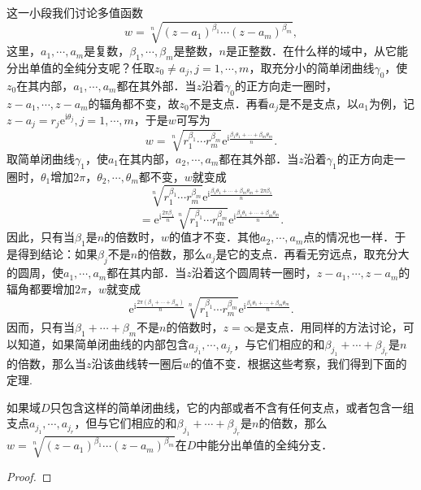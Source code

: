 \documentclass[../../main.tex]{subfiles}
\begin{document}
这一小段我们讨论多值函数
\[
w = \sqrt[n]{(z - a_1)^{\beta_1} \cdots (z - a_m)^{\beta_m}},
\]
这里，$a_1, \cdots, a_m$是复数，$\beta_1, \cdots, \beta_m$是整数，$n$是正整数．在什么样的域中，从它能分出单值的全纯分支呢？任取$z_0 \neq a_j, j = 1, \cdots, m$，取充分小的简单闭曲线$\gamma_0$，使$z_0$在其内部，$a_1, \cdots, a_m$都在其外部．当$z$沿着$\gamma_0$的正方向走一圈时，$z - a_1, \cdots, z - a_m$的辐角都不变，故$z_0$不是支点．再看$a_j$是不是支点，以$a_1$为例，记$z - a_j = r_j \text{e}^{\text{i}\theta_j}, j = 1, \cdots, m$，于是$w$可写为
\[
w = \sqrt[n]{r_1^{\beta_1} \cdots r_m^{\beta_m}} \text{e}^{\text{i}\frac{\beta_1 \theta_1 + \cdots + \beta_m \theta_m}{n}}.
\]
取简单闭曲线$\gamma_1$，使$a_1$在其内部，$a_2, \cdots, a_m$都在其外部．当$z$沿着$\gamma_1$的正方向走一圈时，$\theta_1$增加$2\pi$，$\theta_2, \cdots, \theta_m$都不变，$w$就变成
\[
\sqrt[n]{r_1^{\beta_1} \cdots r_m^{\beta_m}} \text{e}^{\text{i}\frac{\beta_1 \theta_1 + \cdots + \beta_m \theta_m + 2\pi \beta_1}{n}}
\]
\[
= \text{e}^{\text{i}\frac{2\pi \beta_1}{n}} \sqrt[n]{r_1^{\beta_1} \cdots r_m^{\beta_m}} \text{e}^{\text{i}\frac{\beta_1 \theta_1 + \cdots + \beta_m \theta_m}{n}}.
\]
因此，只有当$\beta_1$是$n$的倍数时，$w$的值才不变．其他$a_2, \cdots, a_m$点的情况也一样．于是得到结论：如果$\beta_j$不是$n$的倍数，那么$a_j$是它的支点．再看无穷远点，取充分大的圆周，使$a_1, \cdots, a_m$都在其内部．当$z$沿着这个圆周转一圈时，$z - a_1, \cdots, z - a_m$的辐角都要增加$2\pi$，$w$就变成
\[
\text{e}^{\text{i}\frac{2\pi (\beta_1 + \cdots + \beta_m)}{n}} \sqrt[n]{r_1^{\beta_1} \cdots r_m^{\beta_m}} \text{e}^{\text{i}\frac{\beta_1 \theta_1 + \cdots + \beta_m \theta_m}{n}}.
\]
因而，只有当$\beta_1 + \cdots + \beta_m$不是$n$的倍数时，$z = \infty$是支点．用同样的方法讨论，可以知道，如果简单闭曲线的内部包含$a_{j_1}, \cdots, a_{j_r}$，与它们相应的和$\beta_{j_1} + \cdots + \beta_{j_r}$是$n$的倍数，那么当$z$沿该曲线转一圈后$w$的值不变．根据这些考察，我们得到下面的定理.

\begin{theorem}\label{theorem:多值函数分出单值全纯分支}
如果域$D$只包含这样的简单闭曲线，它的内部或者不含有任何支点，或者包含一组支点$a_{j_1}, \cdots, a_{j_r}$，但与它们相应的和$\beta_{j_1} + \cdots + \beta_{j_r}$是$n$的倍数，那么$w = \sqrt[n]{(z - a_1)^{\beta_1} \cdots (z - a_m)^{\beta_m}}$在$D$中能分出单值的全纯分支．
\end{theorem}
\begin{proof}


\end{proof}
\end{document}
